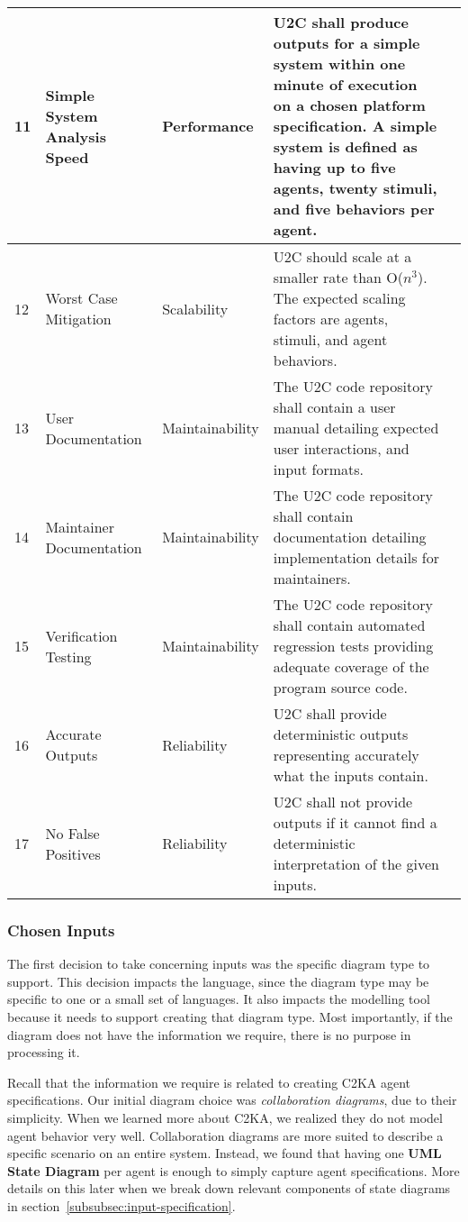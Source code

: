 \documentclass[11pt]{article}
\begin{document}
\begin{longtable}{|l|p{2.6cm}|l|p{4.5cm}|c|}
        \hline
        11 & Simple System Analysis Speed & Performance & U2C shall produce outputs for a simple system within one minute of execution on a chosen platform specification.
        A simple system is defined as having up to five agents, twenty stimuli, and five behaviors per agent. & \cellcolor{gray!30}  \\
        \hline
        12 & Worst Case Mitigation & Scalability & U2C should scale at a smaller rate than O($n^3$). The expected scaling factors are agents, stimuli, and agent behaviors. & \cellcolor{gray!30}  \\
        \hline
        13 & User Documentation & Maintainability & The U2C code repository shall contain a user manual detailing expected user interactions, and input formats. & \cellcolor{gray!30}  \\
        \hline
        14 & Maintainer Documentation & Maintainability & The U2C code repository shall contain documentation detailing implementation details for maintainers. & \cellcolor{green!30}  \\
        \hline
        15 & Verification Testing & Maintainability & The U2C code repository shall contain automated regression tests providing adequate coverage of the program source code. & \cellcolor{green!30}  \\
        \hline
        16 & Accurate Outputs & Reliability & U2C shall provide deterministic outputs representing accurately what the inputs contain. & \cellcolor{green!30}  \\
        \hline
        17 & No False Positives & Reliability & U2C shall not provide outputs if it cannot find a deterministic interpretation of the given inputs. & \cellcolor{green!30}  \\
        \hline
    \end{longtable}

    \subsubsection{Chosen Inputs}
    The first decision to take concerning inputs was the specific diagram type to support.
    This decision impacts the language, since the diagram type may be specific to one or a small set of languages.
    It also impacts the modelling tool because it needs to support creating that diagram type.
    Most importantly, if the diagram does not have the information we require, there is no purpose in processing it.
    
    Recall that the information we require is related to creating C2KA agent specifications.
    Our initial diagram choice was \textit{collaboration diagrams}, due to their simplicity. 
    When we learned more about C2KA, we realized they do not model agent behavior very well.
    Collaboration diagrams are more suited to describe a specific scenario on an entire system.
    Instead, we found that having one \textbf{UML State Diagram} per agent is enough to simply capture agent specifications.
    More details on this later when we break down relevant components of state diagrams in section~\ref{subsubsec:input-specification}.
\end{document}
